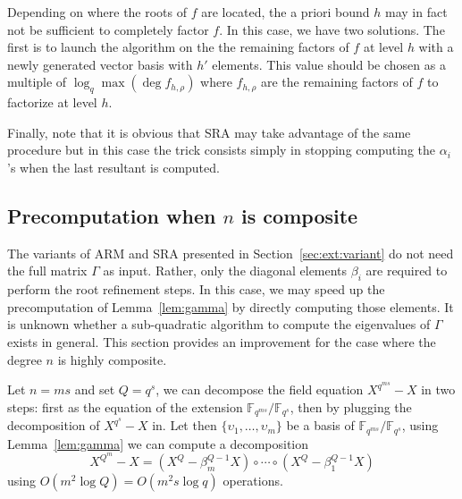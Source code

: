 \documentclass{sig-alternate}
\newcommand{\ff}[1]{\mathbb{F}_{#1}}
\newcommand{\qq}{q}
\newcommand{\QQ}{Q}
\newcommand{\nn}{n}
\newcounter{algo}
\begin{document}
Depending on where the roots of $f$ are located, the a priori bound $h$ may in fact not be sufficient to completely factor $f$. In this case, we have two solutions.
The first is to launch the algorithm on the the remaining factors of $f$ at level $h$ with a newly generated vector basis with $h'$ elements. This value should be chosen 
 as a multiple of $\log_{\qq} \max(\deg f_{h,\rho})$ where $f_{h,\rho}$ are the remaining factors of $f$ to factorize at level $h$.
 
Finally, note that it is obvious that SRA may take advantage of the same procedure but in this case the trick consists simply in stopping computing the $\alpha_i$'s when the last resultant is computed.
 



\subsection{Precomputation when $n$ is composite}

The variants of ARM and SRA presented in Section~\ref{sec:ext:variant}
do not need the full matrix $\Gamma$ as input. Rather, only the
diagonal elements $\beta_i$ are required to perform the root
refinement steps. In this case, we may speed up the precomputation of
Lemma~\ref{lem:gamma} by directly computing those elements. It is
unknown whether a sub-quadratic algorithm to compute the eigenvalues
of $\Gamma$ exists in general. This section provides an improvement
for the case where the degree $\nn$ is highly composite.

Let $\nn=ms$ and set $\QQ=\qq^s$, we can decompose the field equation
$X^{\qq^{ms}}-X$ in two steps: first as the equation of the extension
$\ff{\qq^{ms}}/\ff{\qq^s}$, then by plugging the decomposition of
$X^{\qq^s}-X$ in. Let then $\{\upsilon_1,\dots,\upsilon_m\}$ be a
basis of $\ff{\qq^{ms}}/\ff{\qq^s}$, using Lemma~\ref{lem:gamma} we
can compute a decomposition
\begin{equation}
  \label{eq:decompQm}
  X^{\QQ^m}-X = (X^\QQ - \beta_m^{\QQ-1}X)\circ\cdots\circ(X^\QQ - \beta_1^{\QQ-1}X)
\end{equation}
using $O(m^2\log\QQ) = O(m^2s\log\qq)$ operations.
\end{document}
